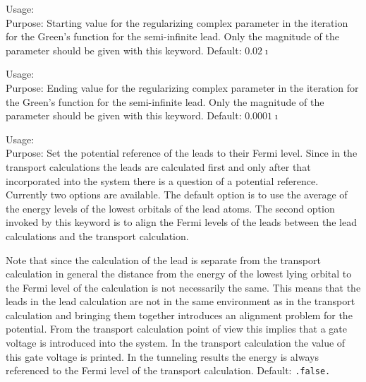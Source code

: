 {
  \noindent
  Usage:    \\[1.0ex]
  Purpose: Starting value for the regularizing complex parameter in
  the iteration for the Green's function for the semi-infinite
  lead. Only the magnitude of the parameter should be given with this
  keyword. Default: $0.02\imath$}

{
  \noindent
  Usage:    \\[1.0ex]
  Purpose: Ending value for the regularizing complex parameter in
  the iteration for the Green's function for the semi-infinite
  lead. Only the magnitude of the parameter should be given with this
  keyword. Default: $0.0001\imath$}

{
  \noindent
  Usage:   \\[1.0ex]

  Purpose: Set the potential reference of the leads to their Fermi
  level. Since in the transport calculations the leads are calculated
  first and only after that incorporated into the system there is a
  question of a potential reference. Currently two options are
  available. The default option is to use the average of the energy
  levels of the lowest orbitals of the lead atoms. The second option
  invoked by this keyword is to align the Fermi levels of the leads
  between the lead calculations and the transport calculation.
  
  Note that since the calculation of the lead is separate from the
  transport calculation in general the distance from the energy of the
  lowest lying orbital to the Fermi level of the calculation is not
  necessarily the same. This means that the leads in the lead
  calculation are not in the same environment as in the transport
  calculation and bringing them together introduces an alignment
  problem for the potential. From the transport calculation point of
  view this implies that a gate voltage is introduced into the
  system. In the transport calculation the value of this gate voltage
  is printed. In the tunneling results the energy is always
  referenced to the Fermi level of the transport calculation. Default:
  \texttt{.false.}}
